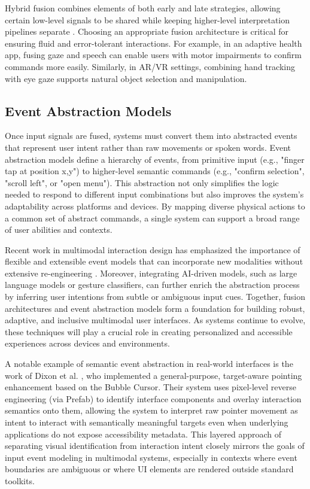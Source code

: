 \documentclass[openany]{book}
\begin{document}
Hybrid fusion combines elements of both early and late strategies, allowing certain low-level signals to be shared while keeping higher-level interpretation pipelines separate \cite{baltrušaitis2017multimodalmachinelearningsurvey, Oviatt1999}.
Choosing an appropriate fusion architecture is critical for ensuring fluid and error-tolerant interactions. For example, in an adaptive health app, fusing gaze and speech can enable users with motor impairments to confirm commands more easily. Similarly, in AR/VR settings, combining hand tracking with eye gaze supports natural object selection and manipulation.

\subsection{Event Abstraction Models}
Once input signals are fused, systems must convert them into abstracted events that represent user intent rather than raw movements or spoken words. Event abstraction models define a hierarchy of events, from primitive input (e.g., "finger tap at position x,y") to higher-level semantic commands (e.g., "confirm selection", "scroll left", or "open menu").
This abstraction not only simplifies the logic needed to respond to different input combinations but also improves the system’s adaptability across platforms and devices. By mapping diverse physical actions to a common set of abstract commands, a single system can support a broad range of user abilities and contexts.

Recent work in multimodal interaction design has emphasized the importance of flexible and extensible event models that can incorporate new modalities without extensive re-engineering \cite{Bolt1980}. Moreover, integrating AI-driven models, such as large language models or gesture classifiers, can further enrich the abstraction process by inferring user intentions from subtle or ambiguous input cues.
Together, fusion architectures and event abstraction models form a foundation for building robust, adaptive, and inclusive multimodal user interfaces. As systems continue to evolve, these techniques will play a crucial role in creating personalized and accessible experiences across devices and environments.


A notable example of semantic event abstraction in real-world interfaces is the work of Dixon et al. \cite{Dixon}, who implemented a general-purpose, target-aware pointing enhancement based on the Bubble Cursor. Their system uses pixel-level reverse engineering (via Prefab) to identify interface components and overlay interaction semantics onto them, allowing the system to interpret raw pointer movement as intent to interact with semantically meaningful targets even when underlying applications do not expose accessibility metadata. This layered approach of separating visual identification from interaction intent closely mirrors the goals of input event modeling in multimodal systems, especially in contexts where event boundaries are ambiguous or where UI elements are rendered outside standard toolkits.
\end{document}
